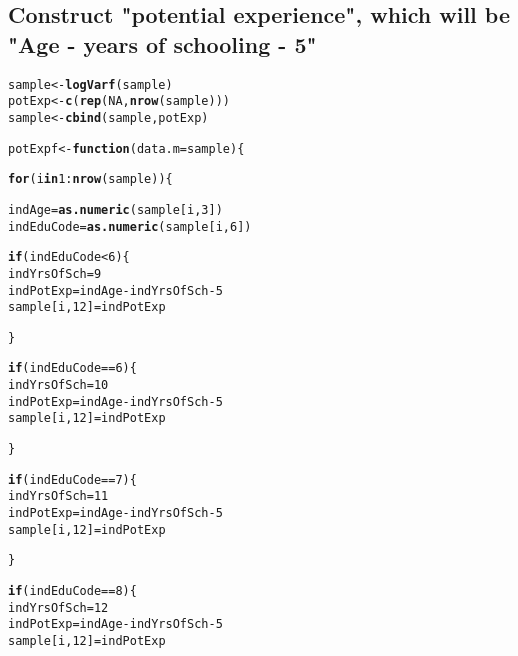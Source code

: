 \documentclass{article}\usepackage[]{graphicx}\usepackage[]{color}
\makeatletter
\newcommand{\hlnum}[1]{\textcolor[rgb]{0.686,0.059,0.569}{#1}}%
\newcommand{\hlopt}[1]{\textcolor[rgb]{0,0,0}{#1}}%
\newcommand{\hlstd}[1]{\textcolor[rgb]{0.345,0.345,0.345}{#1}}%
\newcommand{\hlkwa}[1]{\textcolor[rgb]{0.161,0.373,0.58}{\textbf{#1}}}%
\newcommand{\hlkwb}[1]{\textcolor[rgb]{0.69,0.353,0.396}{#1}}%
\newcommand{\hlkwc}[1]{\textcolor[rgb]{0.333,0.667,0.333}{#1}}%
\newcommand{\hlkwd}[1]{\textcolor[rgb]{0.737,0.353,0.396}{\textbf{#1}}}%
\newenvironment{kframe}{%
 \def\at@end@of@kframe{}%
 \ifinner\ifhmode%
  \def\at@end@of@kframe{\end{minipage}}%
  \begin{minipage}{\columnwidth}%
 \fi\fi%
 \def\FrameCommand##1{\hskip\@totalleftmargin \hskip-\fboxsep
 \colorbox{shadecolor}{##1}\hskip-\fboxsep
     \hskip-\linewidth \hskip-\@totalleftmargin \hskip\columnwidth}%
 \MakeFramed {\advance\hsize-\width
   \@totalleftmargin\z@ \linewidth\hsize
   \@setminipage}}%
 {\par\unskip\endMakeFramed%
 \at@end@of@kframe}
\newenvironment{knitrout}{}{} %
\makeatother
\begin{document}
\subsection{Construct "potential experience", which will be "Age - years of schooling - 5"}

\begin{knitrout}
\color{fgcolor}\begin{kframe}
\begin{alltt}
\hlstd{sample} \hlkwb{<-} \hlkwd{logVarf}\hlstd{(sample)}
\hlstd{potExp} \hlkwb{<-} \hlkwd{c}\hlstd{(}\hlkwd{rep}\hlstd{(}\hlnum{NA}\hlstd{,} \hlkwd{nrow}\hlstd{(sample)))}
\hlstd{sample} \hlkwb{<-} \hlkwd{cbind}\hlstd{(sample, potExp)}

\hlstd{potExpf} \hlkwb{<-} \hlkwa{function}\hlstd{(}\hlkwc{data.m} \hlstd{= sample)\{}

  \hlkwa{for} \hlstd{(i} \hlkwa{in} \hlnum{1}\hlopt{:}\hlkwd{nrow}\hlstd{(sample))\{}

    \hlstd{indAge} \hlkwb{=} \hlkwd{as.numeric}\hlstd{(sample[i,}\hlnum{3}\hlstd{])}
    \hlstd{indEduCode} \hlkwb{=} \hlkwd{as.numeric}\hlstd{(sample[i,}\hlnum{6}\hlstd{])}

    \hlkwa{if} \hlstd{(indEduCode} \hlopt{<} \hlnum{6}\hlstd{)\{}
      \hlstd{indYrsOfSch} \hlkwb{=} \hlnum{9}
      \hlstd{indPotExp} \hlkwb{=} \hlstd{indAge} \hlopt{-} \hlstd{indYrsOfSch} \hlopt{-} \hlnum{5}
      \hlstd{sample[i,}\hlnum{12}\hlstd{]} \hlkwb{=} \hlstd{indPotExp}

    \hlstd{\}}

    \hlkwa{if} \hlstd{(indEduCode} \hlopt{==} \hlnum{6}\hlstd{)\{}
      \hlstd{indYrsOfSch} \hlkwb{=} \hlnum{10}
      \hlstd{indPotExp} \hlkwb{=} \hlstd{indAge} \hlopt{-} \hlstd{indYrsOfSch} \hlopt{-} \hlnum{5}
      \hlstd{sample[i,}\hlnum{12}\hlstd{]} \hlkwb{=} \hlstd{indPotExp}

    \hlstd{\}}

    \hlkwa{if} \hlstd{(indEduCode} \hlopt{==} \hlnum{7}\hlstd{)\{}
      \hlstd{indYrsOfSch} \hlkwb{=} \hlnum{11}
      \hlstd{indPotExp} \hlkwb{=} \hlstd{indAge} \hlopt{-} \hlstd{indYrsOfSch} \hlopt{-} \hlnum{5}
      \hlstd{sample[i,}\hlnum{12}\hlstd{]} \hlkwb{=} \hlstd{indPotExp}

    \hlstd{\}}

    \hlkwa{if} \hlstd{(indEduCode} \hlopt{==} \hlnum{8}\hlstd{)\{}
      \hlstd{indYrsOfSch} \hlkwb{=} \hlnum{12}
      \hlstd{indPotExp} \hlkwb{=} \hlstd{indAge} \hlopt{-} \hlstd{indYrsOfSch} \hlopt{-} \hlnum{5}
      \hlstd{sample[i,}\hlnum{12}\hlstd{]} \hlkwb{=} \hlstd{indPotExp}


\end{alltt}
\end{kframe}
\end{knitrout}
\end{document}
